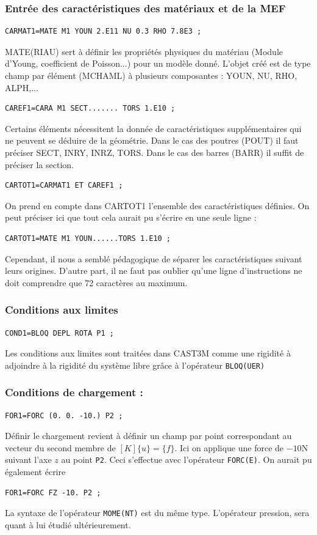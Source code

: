 \documentclass[a4paper,multicol]{article}
\begin{document}
\subsubsection*{Entrée des caractéristiques des matériaux et de la MEF} 
\begin{verbatim}
CARMAT1=MATE M1 YOUN 2.E11 NU 0.3 RHO 7.8E3 ;
\end{verbatim}
MATE(RIAU) sert à définir les propriétés physiques du matériau (Module d'Young, coefficient de Poisson...) pour un modèle donné. L'objet créé est de type champ par élément
(MCHAML) à plusieurs composantes : YOUN, NU, RHO, ALPH,...
\begin{verbatim}
CAREF1=CARA M1 SECT....... TORS 1.E10 ;
\end{verbatim}
Certains éléments nécessitent la donnée de caractéristiques supplémentaires qui ne peuvent se déduire de la géométrie. Dans le cas des poutres (POUT) il faut préciser SECT, INRY, INRZ, TORS. Dans le cas des barres (BARR) il suffit de préciser la section. 
\begin{verbatim}
CARTOT1=CARMAT1 ET CAREF1 ;
\end{verbatim}
On prend en compte dans CARTOT1 l'ensemble des caractéristiques définies. On peut préciser ici que tout cela aurait pu s'écrire en une seule ligne :
\begin{verbatim}
CARTOT1=MATE M1 YOUN......TORS 1.E10 ;
\end{verbatim}
Cependant, il nous a semblé pédagogique de séparer les caractéristiques suivant leurs origines. D'autre part, il ne faut pas oublier qu'une ligne d'instructions ne doit comprendre que 72 caractères au maximum.
\subsubsection*{Conditions aux limites} 
\begin{verbatim}
COND1=BLOQ DEPL ROTA P1 ;
\end{verbatim}
Les conditions aux limites sont traitées dans CAST3M comme une rigidité à adjoindre à la rigidité du système libre grâce à l'opérateur {\tt BLOQ(UER)}

\subsubsection*{Conditions de chargement :} 
\begin{verbatim}
FOR1=FORC (0. 0. -10.) P2 ;
\end{verbatim}

Définir le chargement revient à définir un champ par point correspondant au vecteur du second membre de $[K]\{u\} = \{f\}$. Ici on applique une force de $-10$N suivant l'axe $z$ au point {\tt P2}. Ceci s'effectue avec l'opérateur  {\tt FORC(E)}. On aurait pu également écrire
\begin{verbatim}
FOR1=FORC FZ -10. P2 ;
\end{verbatim}
La syntaxe de l'opérateur {\tt MOME(NT)} est du même type. L'opérateur pression, sera quant à lui étudié ultérieurement.
\end{document}
